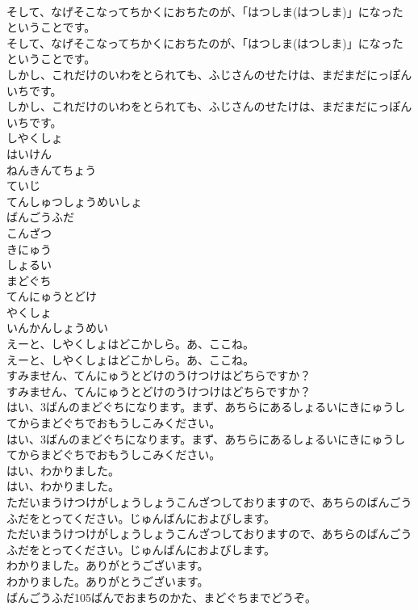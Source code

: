 \documentclass[8pt]{extreport}
\begin{document}
\begin{CJK}{UTF8}{min}
\\	そして、なげそこなってちかくにおちたのが、「はつしま(はつしま)」になったということです。	
\\	そして、なげそこなってちかくにおちたのが、「はつしま(はつしま)」になったということです。 
\\	しかし、これだけのいわをとられても、ふじさんのせたけは、まだまだにっぽんいちです。	
\\	しかし、これだけのいわをとられても、ふじさんのせたけは、まだまだにっぽんいちです。 
\\	しやくしょ
\\	はいけん
\\	ねんきんてちょう
\\	ていじ
\\	てんしゅつしょうめいしょ
\\	ばんごうふだ
\\	こんざつ
\\	きにゅう
\\	しょるい
\\	まどぐち
\\	てんにゅうとどけ
\\	やくしょ
\\	いんかんしょうめい
\\	えーと、しやくしょはどこかしら。あ、ここね。	
\\	えーと、しやくしょはどこかしら。あ、ここね。 
\\	すみません、てんにゅうとどけのうけつけはどちらですか？	
\\	すみません、てんにゅうとどけのうけつけはどちらですか？ 
\\	はい、3ばんのまどぐちになります。まず、あちらにあるしょるいにきにゅうしてからまどぐちでおもうしこみください。	
\\	はい、3ばんのまどぐちになります。まず、あちらにあるしょるいにきにゅうしてからまどぐちでおもうしこみください。 
\\	はい、わかりました。	
\\	はい、わかりました。 
\\	ただいまうけつけがしょうしょうこんざつしておりますので、あちらのばんごうふだをとってください。じゅんばんにおよびします。	
\\	ただいまうけつけがしょうしょうこんざつしておりますので、あちらのばんごうふだをとってください。じゅんばんにおよびします。 
\\	わかりました。ありがとうございます。	
\\	わかりました。ありがとうございます。 
\\	ばんごうふだ105ばんでおまちのかた、まどぐちまでどうぞ。	

\end{CJK}
\end{document}
